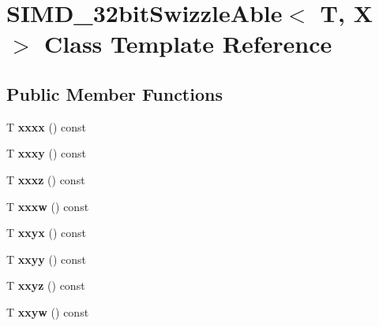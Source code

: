 \hypertarget{classSIMD__32bitSwizzleAble}{}\section{S\+I\+M\+D\+\_\+32bit\+Swizzle\+Able$<$ T, X $>$ Class Template Reference}
\label{classSIMD__32bitSwizzleAble}
\subsection*{Public Member Functions}
\begin{DoxyCompactItemize}
\item 
T {\bfseries xxxx} () const \hypertarget{classSIMD__32bitSwizzleAble_a9e2a6132d637d50dc5ecde54024ea70d}{}\label{classSIMD__32bitSwizzleAble_a9e2a6132d637d50dc5ecde54024ea70d}

\item 
T {\bfseries xxxy} () const \hypertarget{classSIMD__32bitSwizzleAble_a09e4cee0ed2892622c91a7e87727aa21}{}\label{classSIMD__32bitSwizzleAble_a09e4cee0ed2892622c91a7e87727aa21}

\item 
T {\bfseries xxxz} () const \hypertarget{classSIMD__32bitSwizzleAble_a44f357adacce8fbc164e5066687e0226}{}\label{classSIMD__32bitSwizzleAble_a44f357adacce8fbc164e5066687e0226}

\item 
T {\bfseries xxxw} () const \hypertarget{classSIMD__32bitSwizzleAble_a9f88fc780f1e3ba69c7794df667de971}{}\label{classSIMD__32bitSwizzleAble_a9f88fc780f1e3ba69c7794df667de971}

\item 
T {\bfseries xxyx} () const \hypertarget{classSIMD__32bitSwizzleAble_ae0052c86d2073c9350ef40690c293803}{}\label{classSIMD__32bitSwizzleAble_ae0052c86d2073c9350ef40690c293803}

\item 
T {\bfseries xxyy} () const \hypertarget{classSIMD__32bitSwizzleAble_ae4c3ae079a1da30e53d093504a89fa08}{}\label{classSIMD__32bitSwizzleAble_ae4c3ae079a1da30e53d093504a89fa08}

\item 
T {\bfseries xxyz} () const \hypertarget{classSIMD__32bitSwizzleAble_a18c99f5e6b3d829ac9a28d32ab5f997f}{}\label{classSIMD__32bitSwizzleAble_a18c99f5e6b3d829ac9a28d32ab5f997f}

\item 
T {\bfseries xxyw} () const \hypertarget{classSIMD__32bitSwizzleAble_ae2d6f64ce82002ffa411f66850d22502}{}\label{classSIMD__32bitSwizzleAble_ae2d6f64ce82002ffa411f66850d22502}


\end{DoxyCompactItemize}

